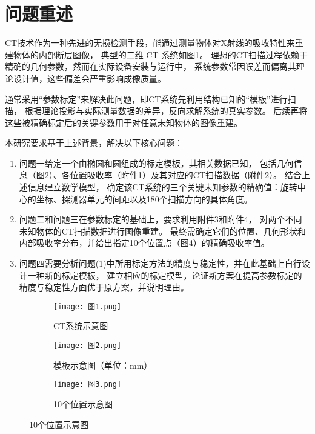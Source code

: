 \section{\heiti 问题重述}
CT技术作为一种先进的无损检测手段，能通过测量物体对X射线的吸收特性来重建物体的内部断层图像，
典型的二维 CT 系统如图\ref{fig:p1}。
理想的CT扫描过程依赖于精确的几何参数，然而在实际设备安装与运行中，
系统参数常因误差而偏离其理论设计值，这些偏差会严重影响成像质量。
\par
通常采用“参数标定”来解决此问题，即CT系统先利用结构已知的“模板”进行扫描，
根据理论投影与实际测量数据的差异，反向求解系统的真实参数。
后续再将这些被精确标定后的关键参数用于对任意未知物体的图像重建。
\par
本研究要求基于上述背景，解决以下核心问题：

\begin{enumerate}[label=(\arabic*), left=0.5em]
    \item 问题一给定一个由椭圆和圆组成的标定模板，其相关数据已知，
    包括几何信息（图\ref{fig:p2}）、各位置吸收率（附件1）及其对应的CT扫描数据（附件2）。
    结合上述信息建立数学模型，
    确定该CT系统的三个关键未知参数的精确值：旋转中心的坐标、探测器单元的间距以及180个扫描方向的具体角度。
    \item 问题二和问题三在参数标定的基础上，要求利用附件3和附件4，
    对两个不同未知物体的CT扫描数据进行图像重建。
    最终需确定它们的位置、几何形状和内部吸收率分布，并给出指定10个位置点（图\ref{fig:p3}）的精确吸收率值。
    \item 问题四需要分析问题(1)中所用标定方法的精度与稳定性，并在此基础上自行设计一种新的标定模板，
    建立相应的标定模型，论证新方案在提高参数标定的精度与稳定性方面优于原方案，并说明理由。
\end{enumerate}

\begin{figure}[htbp]
    \centering 

    \begin{subfigure}{0.3\textwidth}
        \centering
        \texttt{[image: 图1.png]}
        \caption{CT系统示意图}
        \label{fig:p1}
    \end{subfigure}
    \hfill 
    \begin{subfigure}{0.3\textwidth}
        \centering
        \texttt{[image: 图2.png]}
        \caption{模板示意图（单位：mm）}
        \label{fig:p2}
    \end{subfigure}
    \hfill 
    \begin{subfigure}{0.3\textwidth}
        \centering
        \texttt{[image: 图3.png]}
        \caption{10个位置示意图}
        \label{fig:p3}
    \end{subfigure}

\end{figure}

